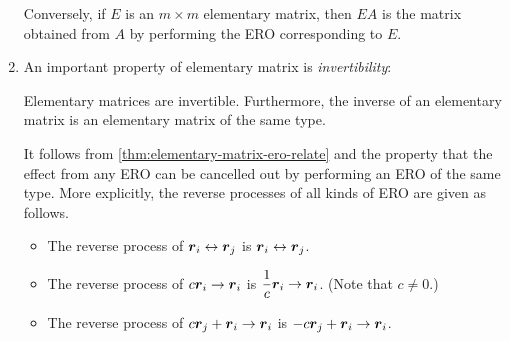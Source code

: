 \begin{enumerate}
\begin{theorem}
Conversely, if \(E\) is an \(m\times m\) elementary matrix, then \(EA\) is the
matrix obtained from \(A\) by performing the ERO corresponding to \(E\).
\end{theorem}
\item An important property of elementary matrix is \emph{invertibility}:
\begin{proposition}
\label{prp:elementary-matrix-inv}
Elementary matrices are invertible. Furthermore, the inverse of an elementary
matrix is an elementary matrix of the same type.
\end{proposition}
\begin{pf}
It follows from \cref{thm:elementary-matrix-ero-relate} and the property that
the effect from any ERO can be cancelled out by performing an ERO of the same
type. More explicitly, the reverse processes of all kinds of ERO are given as
follows.
\begin{itemize}
\item The reverse process of \(\vb*{r}_{i}\leftrightarrow \vb*{r}_{j}\) is
\(\vb*{r}_{i}\leftrightarrow \vb*{r}_{j}\).
\item The reverse process of \(c\vb*{r}_{i}\to \vb*{r}_{i}\) is
\(\displaystyle \frac{1}{c}\vb*{r}_{i}\to\vb*{r}_{i}\). (Note that \(c\ne 0\).)
\item The reverse process of \(c\vb*{r}_{j}+\vb*{r}_{i}\to \vb*{r}_{i}\) is
\(-c\vb*{r}_{j}+\vb*{r}_{i}\to \vb*{r}_{i}\).
\end{itemize}
\end{pf}
\end{enumerate}

